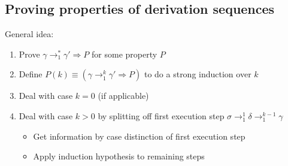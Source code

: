 \documentclass{article}
\def\li{\rightarrow}
\begin{document}
\subsection{Proving properties of derivation sequences}
General idea:
\begin{enumerate}
    \item Prove  $\gamma \li_1^* \gamma' \Rightarrow P$ for some property $P$
    \item Define $P(k)\equiv (\gamma \li_1^k \gamma' \Rightarrow P)$ to do a strong induction
    over $k$ 
    \item Deal with case $k=0$ (if applicable)
    \item Deal with case $k>0$ by splitting off first execution step 
    $\sigma \li_1^1 \delta \li_1^{k-1} \gamma$
    \begin{itemize}
        \item Get information by case distinction of first execution step
        \item Apply induction hypothesis to remaining steps
    \end{itemize}

\end{enumerate}
\end{document}
